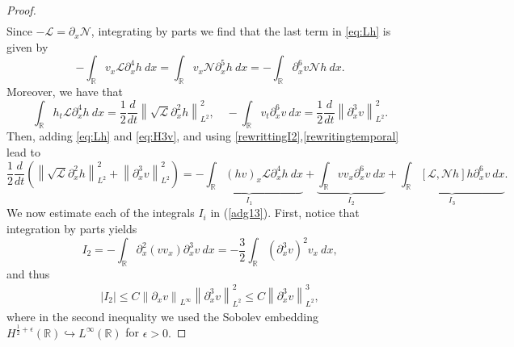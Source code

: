 \documentclass[final,11pt,a4paper,reqno]{amsart}
\newcommand{\norm}[1]{\left\| #1 \right\|}
\newcommand{\RR}{\mathbb R}
\newcommand{\pa}{\partial}
\theoremstyle{definition}
\begin{document}
\begin{proof}
\begin{align}
\end{align}
Since $-\mathscr{L}=\pa_{x}\mathscr{N}$, integrating by parts we find that the last term in \eqref{eq:Lh} is given by
\begin{equation}\label{rewrittingI2}
 - \int_{\RR} v_{x} \mathscr{L}\pa_{x}^{4}h \  dx=\int_{\RR} v_{x} \mathscr{N}\pa_{x}^{5}h \  dx= -\int_{\RR} \pa_{x}^{6} v \mathscr{N}h \ dx .   
 \end{equation}
Moreover, we have that
\begin{equation}\label{rewritingtemporal}
\int_{\RR} h_{t}\mathscr{L}\pa_{x}^{4}h  \  dx=\frac{1}{2}\frac{d}{dt}\norm{\sqrt{\mathscr{L}}\pa_{x}^{2}h} ^{2}_{L^{2}}, \quad  -\int_{\RR} v_{t} \pa_{x}^{6}v\  dx=  \frac{1}{2}\frac{d}{dt}\norm{\pa_{x}^{3}v}^{2}_{L^{2}}.
\end{equation}
Then, adding \eqref{eq:Lh} and \eqref{eq:H3v}, and using \eqref{rewrittingI2},\eqref{rewritingtemporal} lead to
\begin{equation}\label{adg13}
\frac{1}{2}\frac{d}{dt}\left( \norm{\sqrt{\mathscr{L}}\pa_{x}^{2}h}_{L^{2}}^{2}+ \norm{\pa_{x}^{3}v}_{L^{2}}^{2} \right) =\underbrace{ -\int_{\RR}(hv)_{x} \mathscr{L}\pa_{x}^{4}h \ dx}_{I_{1}}+\underbrace{\int_{\RR}vv_{x} \pa_{x}^{6}v \ dx}_{I_{2}}+\underbrace{\int_{\RR}[\mathscr{L}, \mathscr{N}h] h \pa_{x}^{6}v  \ dx}_{I_{3}}.
\end{equation}
We now estimate each of the integrals $I_{i}$ in (\ref{adg13}).
First, notice that integration by parts yields 
\begin{equation*}
I_{2}=-\int_{\RR} \pa_{x}^{2}(vv_{x})\pa_{x}^{3}v  \  dx =-\frac{3}{2}\int_{\RR}(\pa_{x}^{3}v)^{2} v_{x} \  dx,
\end{equation*}
and thus
\begin{align}\label{est:I2}
|I_{2}|\leq C  \norm{\pa_{x}v}_{L^{\infty}}\norm{\pa_{x}^{3}v}^{2}_{L^{2}}\leq  C \norm{\pa_{x}^{3}v}^{3}_{L^{2}},
\end{align}
where in the second inequality we used the Sobolev embedding $H^{\frac{1}{2}+\epsilon}(\RR)\hookrightarrow L^{\infty}(\RR)$ for $\epsilon>0.$


\end{proof}
\end{document}
